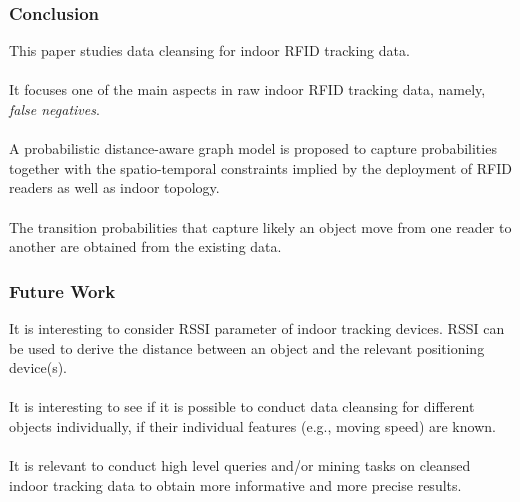 
\begin{frame}
\frametitle{Conclusion}

This paper studies data cleansing for indoor RFID tracking data.\\~\\

It focuses one of the main aspects in raw indoor RFID tracking data, namely, \emph{false negatives}.\\~\\

A probabilistic distance-aware graph model is proposed to capture probabilities together with the spatio-temporal constraints implied by the deployment of RFID readers as well as indoor topology.\\~\\

The transition probabilities that capture likely an object move from one reader to another are obtained from the existing data.

\end{frame}


\begin{frame}
\frametitle{Future Work}

It is interesting to consider RSSI parameter of indoor tracking devices. RSSI can be used to derive the distance between an object and the relevant positioning device(s). \\~\\

It is interesting to see if it is possible to conduct data cleansing for different objects individually, if their individual features (e.g., moving speed) are known. \\~\\

It is relevant to conduct high level queries and/or mining tasks on cleansed indoor tracking data to obtain more informative and more precise results.

\end{frame}
